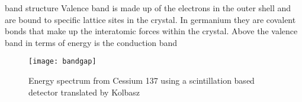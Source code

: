 band structure
Valence band is made up of the electrons in the outer shell and are bound to specific lattice sites in the crystal.
In germanium they are covalent bonds that make up the interatomic forces within the crystal.
Above the valence band in terms of energy is the conduction band
\begin{figure}[htpb]
\centering
\texttt{[image: bandgap]}
\caption{Energy spectrum from Cessium 137 using a scintillation based detector \cite{CS137SPEC} translated by Kolbasz}
\label{fig:bandgap}
\end{figure}